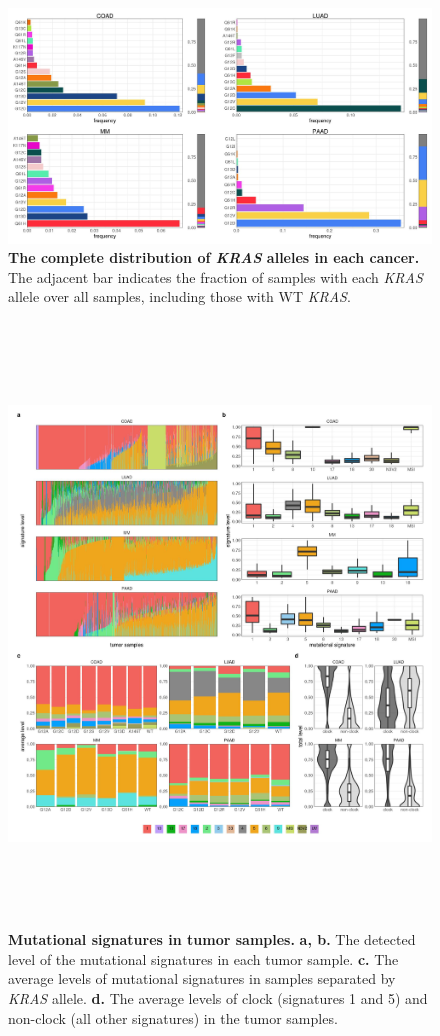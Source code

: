 \documentclass[english, 12pt, letterpaper]{article}
\newcommand{\beginsupplement}{%
        \setcounter{table}{0}
        \renewcommand{\thetable}{\arabic{table}}%
        \setcounter{figure}{0}
        \renewcommand{\thefigure}{\arabic{figure}}%
     }
\newcommand{\KRAS}{\emph{KRAS}}
\begin{document}
\beginsupplement

\begin{figure}[p]
\centering
\includegraphics[width=\textwidth]{figures/SuppFigure_01.jpeg}
\caption{
    \textbf{The complete distribution of \KRAS{} alleles in each cancer.} The adjacent bar indicates the fraction of samples with each \KRAS{} allele over all samples, including those with WT \KRAS{}.
}
\label{sfig:expanded-kras-allele-distribution}
\end{figure}


\begin{figure}[p]
\centering
\includegraphics[height=160mm]{figures/SuppFigure_02.jpeg}
\caption{
    \textbf{Mutational signatures in tumor samples.}
    \textbf{a, b.} The detected level of the mutational signatures in each tumor sample.
    \textbf{c.} The average levels of mutational signatures in samples separated by \KRAS{} allele.
    \textbf{d.} The average levels of clock (signatures 1 and 5) and non-clock (all other signatures) in the tumor samples.
}
\label{sfig:mutational-signatures-summary}
\end{figure}
\end{document}
